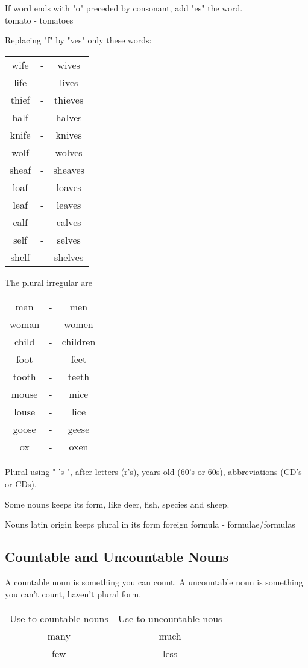 \documentclass[a4paper, titlepage]{article}
\begin{document}
If word ends with "o" preceded by consonant, add "es" the word.\\
tomato - tomatoes


Replacing "f" by "ves" only these words:
\begin{tabular}{ccc}
wife&-&wives\\
life&-&lives\\
thief&-&thieves\\
half&-&halves\\
knife&-&knives\\
wolf&-&wolves\\
sheaf&-&sheaves\\
loaf&-&loaves\\
leaf&-&leaves\\
calf&-&calves\\
self&-&selves\\
shelf&-&shelves\\
\end{tabular}


The plural irregular are
\begin{tabular}{ccc}
man&-&men\\
woman&-&women\\
child&-&children\\
foot&-&feet\\
tooth&-&teeth\\
mouse&-&mice\\
louse&-&lice\\
goose&-&geese\\
ox&-&oxen\\
\end{tabular}


Plural using " 's ", after letters (r's), years old (60's or 60s), abbreviations (CD's or CDs).


Some nouns keeps its form, like deer, fish, species and sheep.


Nouns latin origin keeps plural in its form foreign
formula - formulae/formulas

\subsection{Countable and Uncountable Nouns}

A countable noun is something you can count. A uncountable noun is something you can't count, haven't plural form.


\begin{tabular}{cc}
	Use to countable nouns& Use to uncountable nous\\
	many&much\\
	few&less	
\end{tabular}
\end{document}
